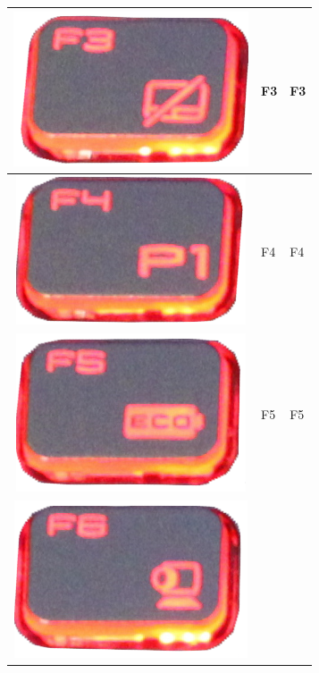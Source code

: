 \begin{longtable}{|cll|}
\begin{minipage}[c]{.4\textwidth}
\vspace{0.2cm}
\includegraphics[scale=0.08]{Images/KeyMapping/F3}
\vspace{0.2cm}
\end{minipage} & F3 & F3\\
\hline
\begin{minipage}[c]{.4\textwidth}
\vspace{0.2cm}
\includegraphics[scale=0.08]{Images/KeyMapping/F4}
\vspace{0.2cm}
\end{minipage} & F4 & F4\\
\hline
\begin{minipage}[c]{.4\textwidth}
\vspace{0.2cm}
\includegraphics[scale=0.08]{Images/KeyMapping/F5}
\vspace{0.2cm}
\end{minipage} & F5 & F5\\
\hline
\begin{minipage}[c]{.4\textwidth}
\vspace{0.2cm}
\includegraphics[scale=0.08]{Images/KeyMapping/F6}

\end{minipage}
\end{longtable}
